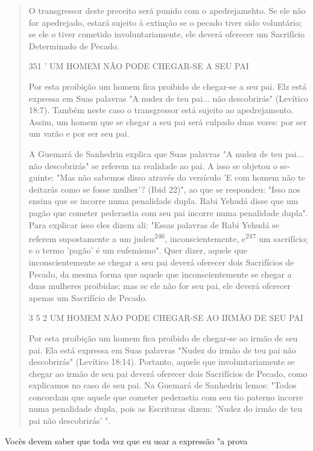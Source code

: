 \begin{quote}
O transgressor deste preceito será punido com o apedrejamehto. Se ele
não for apedrejado, estará sujeito à extinção se o pecado tiver sido
voluntá­rio; se ele o tiver cometido involuntariamente, ele deverá
oferecer um Sacrifí­cio Determinado de Pecado.

351 ' UM HOMEM NÃO PODE CHEGAR-SE A SEU PAI

Por esta proibição um homem fica proibido de chegar-se a seu pai. Elz
está expressa em Suas palavras "A nudez de teu pai... não descobrirás"
(Le­vítico 18:7). Também neste caso o transgressor está sujeito ao
apedrejamento. Assim, um homem que se chegar a seu pai será culpado duas
vezes: por ser um varão e por ser seu pai.

A Guemará de Sanhedrin explica que Suas palavras "A nudez de teu pai...
não descobrirás" se referem na realidade ao pai. A isso se objetou o
se­guinte: "Mas não sabemos disso através do versículo 'E com homem não
te dei­tarás como se fosse mulher'? (Ibid 22)", ao que se respondeu:
"Isso nos ensina que se incorre numa penalidade dupla. Rabi Yehudá disse
que um pagão que cometer pederastia com seu pai incorre numa penalidade
dupla". Para explicar isso eles dizem ali: "Essas palavras de Rabi
Yehudá se referem supostamente a um judeu\textsuperscript{246},
inconscientemente, e\textsuperscript{247} um sacrifício; e o termo
'pagão' é um eufemismo". Quer dizer, aquele que inconscientemente se
chegar a seu pai de­verá oferecer dois Sacrifícios de Pecado, da mesma
forma que aquele que in­conscientemente se chegar a duas mulheres
proibidas; mas se ele não for seu pai, ele deverá oferecer apenas um
Sacrifício de Pecado.

3 5 2 UM HOMEM NÃO PODE CHEGAR-SE AO IRMÃO DE SEU PAI

Por esta proibição um homem fica proibido de chegar-se ao irmão de seu
pai. Ela está expressa em Suas palavras "Nudez do irmão de teu pai não
descobrirás" (Levítico 18:14). Portanto, aquele que involuntariamente se
che­gar ao irmão de seu pai deverá oferecer dois Sacrifícios de Pecado,
como expli­camos no caso de seu pai. Na Guemará de Sanhedrin lemos:
"Todos concor­dam que aquele que cometer pederastia com seu tio paterno
incorre numa pe­nalidade dupla, pois as Escrituras dizem: 'Nudez do
irmão de teu pai não descobrirás' ".
\end{quote}

Vocès devem saber que toda vez que eu usar a expressão "a prova

